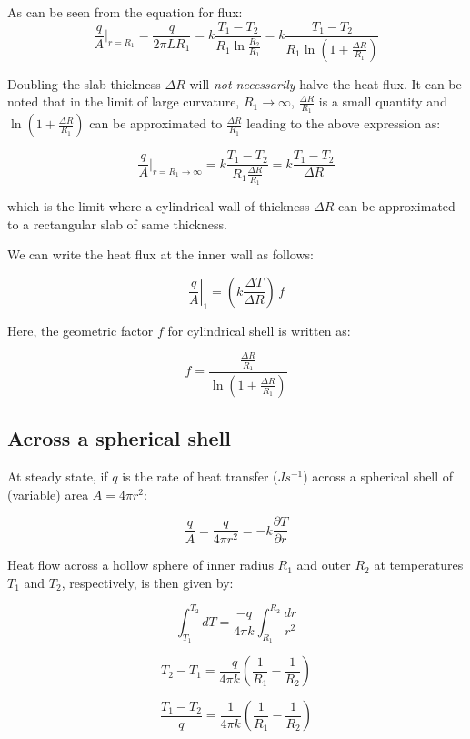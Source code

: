 As can be seen from the equation for flux:
$$\frac{q}{A}|_{r=R_1} = \frac{q}{2\pi L R_1} = k \frac{T_1 - T_2}{R_1
\ln{\frac{R_2}{R_1}}} = k \frac{T_1 - T_2}{R_1 \ln{(1+ \frac{\Delta R}{R_1})}}
$$

Doubling the slab thickness $\Delta R$ will \textit{not necessarily} halve the
heat flux. It can be noted that in the limit of large curvature, $R_1
\rightarrow \infty$, $\frac{\Delta R}{R_1}$ is a small quantity and $\ln{(1+
\frac{\Delta R}{R_1})}$ can be approximated to $\frac{\Delta R}{R_1}$ leading to
the above expression as:

$$\frac{q}{A}|_{r=R_1 \rightarrow \infty} = k \frac{T_1 - T_2}{R_1 \frac{\Delta
R}{R_1}} = k \frac{T_1 - T_2}{ \Delta R} $$

which is the limit where a cylindrical wall of thickness $\Delta R$ can be
approximated to a rectangular slab of same thickness.

We can write the heat flux at the inner wall as follows:

\begin{equation}
	\left. \frac{q}{A} \right|_{1} = \left( k \frac{\Delta T}{\Delta R} \right) \, f 
\end{equation}

Here, the geometric factor $f$ for cylindrical shell is written as:

\begin{equation}
	f = \frac{ \frac{\Delta R}{R_1}}{\ln\left(1 + \frac{\Delta R}{R_1}\right)}
\end{equation}


\subsection{Across a spherical shell}

At steady state, if $q$ is the rate of heat transfer ($Js^{-1}$) across a
spherical shell of (variable) area $A=4\pi r^2$:

$$ \frac{q}{A} = \frac{q}{4\pi r^2} = -k \frac{\partial T}{\partial r} $$

Heat flow across a hollow sphere of inner radius $R_1$ and outer $R_2$ at
temperatures $T_1$ and $T_2$, respectively, is then given by:

$$ \int_{T_1}^{T_2}{dT} = \frac{-q}{4\pi k} \int_{R_1}^{R_2}{\frac{dr}{r^2}}$$

$$ T_2 - T_1 = \frac{-q}{4\pi k} \left( \frac{1}{R_1} - \frac{1}{R_2} \right) $$

\begin{equation}
\boxed{
  \frac{T_1 - T_2}{q} = \frac{1}{4\pi k} \left( \frac{1}{R_1} - \frac{1}{R_2}
\right)
}
\end{equation}

